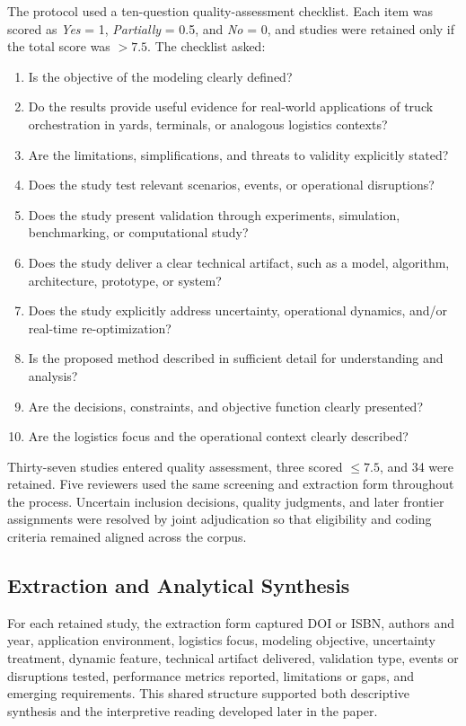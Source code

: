 \documentclass[preprint,12pt,number,longtitle]{elsarticle}
\begin{document}
The protocol used a ten-question quality-assessment checklist. Each item was scored as \textit{Yes} = 1, \textit{Partially} = 0.5, and \textit{No} = 0, and studies were retained only if the total score was $> 7.5$. The checklist asked:
\begin{enumerate}
\item Is the objective of the modeling clearly defined?
\item Do the results provide useful evidence for real-world applications of truck orchestration in yards, terminals, or analogous logistics contexts?
\item Are the limitations, simplifications, and threats to validity explicitly stated?
\item Does the study test relevant scenarios, events, or operational disruptions?
\item Does the study present validation through experiments, simulation, benchmarking, or computational study?
\item Does the study deliver a clear technical artifact, such as a model, algorithm, architecture, prototype, or system?
\item Does the study explicitly address uncertainty, operational dynamics, and/or real-time re-optimization?
\item Is the proposed method described in sufficient detail for understanding and analysis?
\item Are the decisions, constraints, and objective function clearly presented?
\item Are the logistics focus and the operational context clearly described?
\end{enumerate}

Thirty-seven studies entered quality assessment, three scored $\leq 7.5$, and 34 were retained. Five reviewers used the same screening and extraction form throughout the process. Uncertain inclusion decisions, quality judgments, and later frontier assignments were resolved by joint adjudication so that eligibility and coding criteria remained aligned across the corpus.

\subsection{Extraction and Analytical Synthesis}

For each retained study, the extraction form captured DOI or ISBN, authors and year, application environment, logistics focus, modeling objective, uncertainty treatment, dynamic feature, technical artifact delivered, validation type, events or disruptions tested, performance metrics reported, limitations or gaps, and emerging requirements. This shared structure supported both descriptive synthesis and the interpretive reading developed later in the paper.
\end{document}
